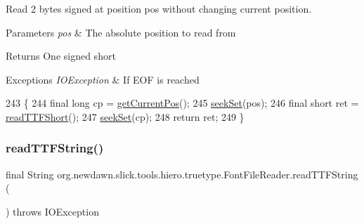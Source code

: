 Read 2 bytes signed at position pos without changing current position.


\begin{DoxyParams}{Parameters}
{\em pos} & The absolute position to read from \\
\hline
\end{DoxyParams}
\begin{DoxyReturn}{Returns}
One signed short 
\end{DoxyReturn}

\begin{DoxyExceptions}{Exceptions}
{\em I\+O\+Exception} & If E\+OF is reached \\
\hline
\end{DoxyExceptions}

\begin{DoxyCode}
243                                                                  \{
244         \textcolor{keyword}{final} \textcolor{keywordtype}{long} cp = \mbox{\hyperlink{classorg_1_1newdawn_1_1slick_1_1tools_1_1hiero_1_1truetype_1_1_font_file_reader_a6eea216bcec24a77aa60baee42672ef9}{getCurrentPos}}();
245         \mbox{\hyperlink{classorg_1_1newdawn_1_1slick_1_1tools_1_1hiero_1_1truetype_1_1_font_file_reader_a9697638485df75a15d10c8b41847241d}{seekSet}}(pos);
246         \textcolor{keyword}{final} \textcolor{keywordtype}{short} ret = \mbox{\hyperlink{classorg_1_1newdawn_1_1slick_1_1tools_1_1hiero_1_1truetype_1_1_font_file_reader_a3a41dc0c99664d00bf0a42ec3d90e584}{readTTFShort}}();
247         \mbox{\hyperlink{classorg_1_1newdawn_1_1slick_1_1tools_1_1hiero_1_1truetype_1_1_font_file_reader_a9697638485df75a15d10c8b41847241d}{seekSet}}(cp);
248         \textcolor{keywordflow}{return} ret;
249     \}
\end{DoxyCode}
\mbox{\label{classorg_1_1newdawn_1_1slick_1_1tools_1_1hiero_1_1truetype_1_1_font_file_reader_a7807f4435a65fbb74d920eb0562f4f33}} 
\subsubsection{\texorpdfstring{read\+T\+T\+F\+String()}{readTTFString()}\hspace{0.1cm}{\footnotesize\ttfamily [1/2]}}
{\footnotesize\ttfamily final String org.\+newdawn.\+slick.\+tools.\+hiero.\+truetype.\+Font\+File\+Reader.\+read\+T\+T\+F\+String (\begin{DoxyParamCaption}{ }\end{DoxyParamCaption}) throws I\+O\+Exception\hspace{0.3cm}{\ttfamily [inline]}}

